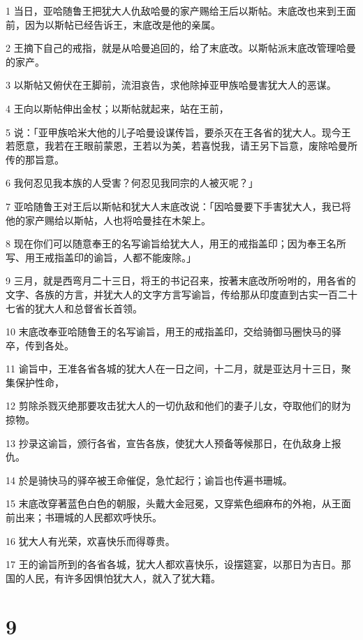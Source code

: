 \par 1 当日，亚哈随鲁王把犹大人仇敌哈曼的家产赐给王后以斯帖。末底改也来到王面前，因为以斯帖已经告诉王，末底改是他的亲属。
\par 2 王摘下自己的戒指，就是从哈曼追回的，给了末底改。以斯帖派末底改管理哈曼的家产。
\par 3 以斯帖又俯伏在王脚前，流泪哀告，求他除掉亚甲族哈曼害犹大人的恶谋。
\par 4 王向以斯帖伸出金杖；以斯帖就起来，站在王前，
\par 5 说：「亚甲族哈米大他的儿子哈曼设谋传旨，要杀灭在王各省的犹大人。现今王若愿意，我若在王眼前蒙恩，王若以为美，若喜悦我，请王另下旨意，废除哈曼所传的那旨意。
\par 6 我何忍见我本族的人受害？何忍见我同宗的人被灭呢？」
\par 7 亚哈随鲁王对王后以斯帖和犹大人末底改说：「因哈曼要下手害犹大人，我已将他的家产赐给以斯帖，人也将哈曼挂在木架上。
\par 8 现在你们可以随意奉王的名写谕旨给犹大人，用王的戒指盖印；因为奉王名所写、用王戒指盖印的谕旨，人都不能废除。」
\par 9 三月，就是西弯月二十三日，将王的书记召来，按著末底改所吩咐的，用各省的文字、各族的方言，并犹大人的文字方言写谕旨，传给那从印度直到古实一百二十七省的犹大人和总督省长首领。
\par 10 末底改奉亚哈随鲁王的名写谕旨，用王的戒指盖印，交给骑御马圈快马的驿卒，传到各处。
\par 11 谕旨中，王准各省各城的犹大人在一日之间，十二月，就是亚达月十三日，聚集保护性命，
\par 12 剪除杀戮灭绝那要攻击犹大人的一切仇敌和他们的妻子儿女，夺取他们的财为掠物。
\par 13 抄录这谕旨，颁行各省，宣告各族，使犹大人预备等候那日，在仇敌身上报仇。
\par 14 於是骑快马的驿卒被王命催促，急忙起行；谕旨也传遍书珊城。
\par 15 末底改穿著蓝色白色的朝服，头戴大金冠冕，又穿紫色细麻布的外袍，从王面前出来；书珊城的人民都欢呼快乐。
\par 16 犹大人有光荣，欢喜快乐而得尊贵。
\par 17 王的谕旨所到的各省各城，犹大人都欢喜快乐，设摆筵宴，以那日为吉日。那国的人民，有许多因惧怕犹大人，就入了犹大籍。

\chapter{9}

